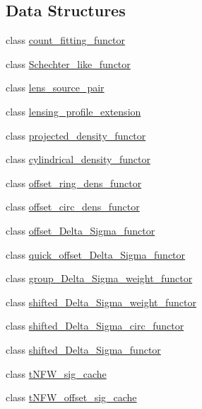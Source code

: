 \subsection*{Data Structures}
\begin{DoxyCompactItemize}
\item 
class \hyperlink{classIceBRG_1_1count__fitting__functor}{count\-\_\-fitting\-\_\-functor}
\item 
class \hyperlink{classIceBRG_1_1Schechter__like__functor}{Schechter\-\_\-like\-\_\-functor}
\item 
class \hyperlink{classIceBRG_1_1lens__source__pair}{lens\-\_\-source\-\_\-pair}
\item 
class \hyperlink{classIceBRG_1_1lensing__profile__extension}{lensing\-\_\-profile\-\_\-extension}
\item 
class \hyperlink{classIceBRG_1_1projected__density__functor}{projected\-\_\-density\-\_\-functor}
\item 
class \hyperlink{classIceBRG_1_1cylindrical__density__functor}{cylindrical\-\_\-density\-\_\-functor}
\item 
class \hyperlink{classIceBRG_1_1offset__ring__dens__functor}{offset\-\_\-ring\-\_\-dens\-\_\-functor}
\item 
class \hyperlink{classIceBRG_1_1offset__circ__dens__functor}{offset\-\_\-circ\-\_\-dens\-\_\-functor}
\item 
class \hyperlink{classIceBRG_1_1offset__Delta__Sigma__functor}{offset\-\_\-\-Delta\-\_\-\-Sigma\-\_\-functor}
\item 
class \hyperlink{classIceBRG_1_1quick__offset__Delta__Sigma__functor}{quick\-\_\-offset\-\_\-\-Delta\-\_\-\-Sigma\-\_\-functor}
\item 
class \hyperlink{classIceBRG_1_1group__Delta__Sigma__weight__functor}{group\-\_\-\-Delta\-\_\-\-Sigma\-\_\-weight\-\_\-functor}
\item 
class \hyperlink{classIceBRG_1_1shifted__Delta__Sigma__weight__functor}{shifted\-\_\-\-Delta\-\_\-\-Sigma\-\_\-weight\-\_\-functor}
\item 
class \hyperlink{classIceBRG_1_1shifted__Delta__Sigma__circ__functor}{shifted\-\_\-\-Delta\-\_\-\-Sigma\-\_\-circ\-\_\-functor}
\item 
class \hyperlink{classIceBRG_1_1shifted__Delta__Sigma__functor}{shifted\-\_\-\-Delta\-\_\-\-Sigma\-\_\-functor}
\item 
class \hyperlink{classIceBRG_1_1tNFW__sig__cache}{t\-N\-F\-W\-\_\-sig\-\_\-cache}
\item 
class \hyperlink{classIceBRG_1_1tNFW__offset__sig__cache}{t\-N\-F\-W\-\_\-offset\-\_\-sig\-\_\-cache}

\end{DoxyCompactItemize}
